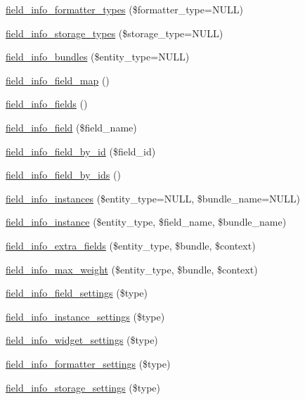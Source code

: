 \begin{DoxyCompactItemize}
\item 
\hyperlink{group__field__info_ga15d0c58339302add261016e73365c526}{field\_\-info\_\-formatter\_\-types} (\$formatter\_\-type=NULL)
\item 
\hyperlink{group__field__info_ga1c47f34b9ccd36dd29cf6059a270573b}{field\_\-info\_\-storage\_\-types} (\$storage\_\-type=NULL)
\item 
\hyperlink{group__field__info_ga256e760ea91818bb5463deb91c8f5c57}{field\_\-info\_\-bundles} (\$entity\_\-type=NULL)
\item 
\hyperlink{group__field__info_gacb01ef76f6e24f61dbd2ae56c44f7eee}{field\_\-info\_\-field\_\-map} ()
\item 
\hyperlink{group__field__info_ga48e54378f3609753346fea1f7f3e7a2c}{field\_\-info\_\-fields} ()
\item 
\hyperlink{group__field__info_ga74cfc942cd2baa5c49780b08c5d357d4}{field\_\-info\_\-field} (\$field\_\-name)
\item 
\hyperlink{group__field__info_ga901d91feefc6639d0ad97289ae472523}{field\_\-info\_\-field\_\-by\_\-id} (\$field\_\-id)
\item 
\hyperlink{group__field__info_ga56b4320178a4409663a3de20b2483e99}{field\_\-info\_\-field\_\-by\_\-ids} ()
\item 
\hyperlink{group__field__info_ga6881d157e9e37472626dbefe406032f4}{field\_\-info\_\-instances} (\$entity\_\-type=NULL, \$bundle\_\-name=NULL)
\item 
\hyperlink{group__field__info_ga7d4361ece7a9a8be980e3fd4a6307564}{field\_\-info\_\-instance} (\$entity\_\-type, \$field\_\-name, \$bundle\_\-name)
\item 
\hyperlink{group__field__info_gae66c2dc5b6bdb9560a0561cefcf093f7}{field\_\-info\_\-extra\_\-fields} (\$entity\_\-type, \$bundle, \$context)
\item 
\hyperlink{group__field__info_ga4761d1f619b3492edd9b133ae63c850b}{field\_\-info\_\-max\_\-weight} (\$entity\_\-type, \$bundle, \$context)
\item 
\hyperlink{group__field__info_ga2841dd4cdcc4099f7995ddc801382b93}{field\_\-info\_\-field\_\-settings} (\$type)
\item 
\hyperlink{group__field__info_gacc329d37a5cdf35417a3415d9686f37a}{field\_\-info\_\-instance\_\-settings} (\$type)
\item 
\hyperlink{group__field__info_gabc6b57b8aa806a133ebe2f2e7db1712f}{field\_\-info\_\-widget\_\-settings} (\$type)
\item 
\hyperlink{group__field__info_gabc16935f6edb0f6dd404f75cccd3fe8c}{field\_\-info\_\-formatter\_\-settings} (\$type)
\item 
\hyperlink{group__field__info_ga378368be6e00368074e604c4185f1b4b}{field\_\-info\_\-storage\_\-settings} (\$type)
\end{DoxyCompactItemize}


